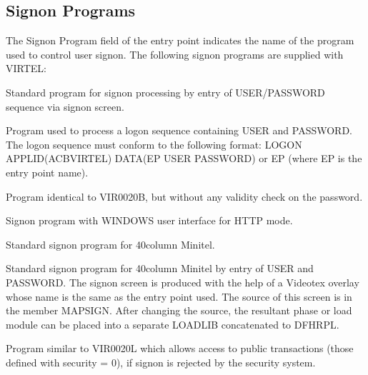 \documentclass[letterpaper,10pt,english]{sphinxmanual}
\begin{document}
\subsection{Signon Programs}
\label{\detokenize{connectivity_guide:signon-programs}}\label{\detokenize{connectivity_guide:index-113}}
\sphinxAtStartPar
The Signon Program field of the entry point indicates the name of the program used to control user sign\sphinxhyphen{}on. The following signon programs are supplied with VIRTEL:
\begin{description}
\sphinxAtStartPar
Standard program for sign\sphinxhyphen{}on processing by entry of USER/PASSWORD sequence via sign\sphinxhyphen{}on screen.

\sphinxAtStartPar
Program used to process a logon sequence containing USER and PASSWORD. The logon sequence must conform to the following format: LOGON APPLID(ACBVIRTEL) DATA(EP USER PASSWORD) or EP (where EP is the entry point name).

\sphinxAtStartPar
Program identical to VIR0020B, but without any validity check on the password.

\sphinxAtStartPar
Sign\sphinxhyphen{}on program with WINDOWS user interface for HTTP mode.

\sphinxAtStartPar
Standard sign\sphinxhyphen{}on program for 40\sphinxhyphen{}column Minitel.

\sphinxAtStartPar
Standard sign\sphinxhyphen{}on program for 40\sphinxhyphen{}column Minitel by entry of USER and PASSWORD. The sign\sphinxhyphen{}on screen is produced with the help of a Videotex overlay whose name is the same as the entry point used. The source of this screen is in the member MAPSIGN. After changing the source, the resultant phase or load module can be placed into a separate LOADLIB concatenated to DFHRPL.

\sphinxAtStartPar
Program similar to VIR0020L which allows access to public transactions (those defined with security = 0), if sign\sphinxhyphen{}on is rejected by the security system.

\end{description}

\ignorespaces 
\end{document}
